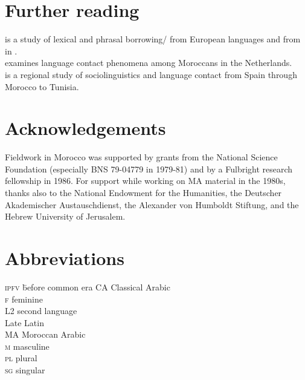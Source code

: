 \documentclass[output=paper]{langsci/langscibook}
\begin{document}
\section*{Further reading}

\citet{Heath1989} is a study of lexical and phrasal borrowing/ from European languages and from   in .\\
\citet{Nortier1990} examines language contact phenomena among Moroccans in the Netherlands.\\
\citet{Sayahi2014} is a regional study of  sociolinguistics and language contact from Spain through Morocco to Tunisia.

\section*{Acknowledgements}

Fieldwork in Morocco was supported by grants from the National Science Foundation (especially BNS 79-04779 in 1979-81) and by a Fulbright research fellowship in 1986. For support while working on MA material in the 1980s, thanks also to the National Endowment for the Humanities, the Deutscher Akademischer Austauschdienst, the Alexander von Humboldt Stiftung, and the {Hebrew} University of {Jerusalem}.


\section*{Abbreviations}
\begin{multicols}{2}
\begin{tabbing}
\textsc{ipfv} \hspace{1em} \= before common era\kill
CA         \> Classical Arabic\\
\textsc{f}  \> feminine\\
L2          \> second language \\
          \> Late Latin\\
MA         \> Moroccan Arabic\\
\textsc{m}  \> masculine\\
\textsc{pl} \> plural\\
\textsc{sg} \> singular
\end{tabbing}
\end{multicols}


{\sloppy\printbibliography[heading=subbibliography,notkeyword=this]}
\end{document}
